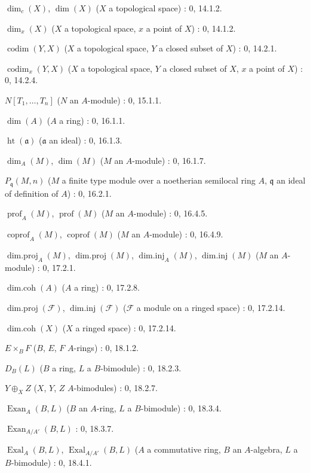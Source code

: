 $\dim_c(X)$, $\dim(X)$ ($X$ a topological space) : 0, 14.1.2.\par
$\dim_x(X)$ ($X$ a topological space, $x$ a point of $X$) : 0, 14.1.2.\par
$\operatorname{codim}(Y,X)$ ($X$ a topological space, $Y$ a closed subset of $X$) : 0, 14.2.1.\par
$\operatorname{codim}_x(Y,X)$ ($X$ a topological space, $Y$ a closed subset of $X$, $x$ a point of $X$) : 0, 14.2.4.\par
$N[T_1,\ldots,T_n]$ ($N$ an $A$-module) : 0, 15.1.1.\par
$\dim(A)$ ($A$ a ring) : 0, 16.1.1.\par
$\operatorname{ht}(\mathfrak a)$ ($\mathfrak a$ an ideal) : 0, 16.1.3.\par
$\dim_A(M)$, $\dim(M)$ ($M$ an $A$-module) : 0, 16.1.7.\par
$P_{\mathfrak q}(M,n)$ ($M$ a finite type module over a noetherian semilocal ring $A$, $\mathfrak q$ an ideal of definition of $A$) : 0, 16.2.1.\par
$\operatorname{prof}_A(M)$, $\operatorname{prof}(M)$ ($M$ an $A$-module) : 0, 16.4.5.\par
$\operatorname{coprof}_A(M)$, $\operatorname{coprof}(M)$ ($M$ an $A$-module) : 0, 16.4.9.\par
$\operatorname{dim.proj}_A(M)$, $\operatorname{dim.proj}(M)$,
$\operatorname{dim.inj}_A(M)$, $\operatorname{dim.inj}(M)$ ($M$ an $A$-module) : 0, 17.2.1.\par
$\operatorname{dim.coh}(A)$ ($A$ a ring) : 0, 17.2.8.\par
$\operatorname{dim.proj}(\mathscr F)$, $\operatorname{dim.inj}(\mathscr F)$
($\mathscr F$ a module on a ringed space) : 0, 17.2.14.\par
$\operatorname{dim.coh}(X)$ ($X$ a ringed space) : 0, 17.2.14.\par
$E\times_B F$ ($B$, $E$, $F$ $A$-rings) : 0, 18.1.2.\par
$D_B(L)$ ($B$ a ring, $L$ a $B$-bimodule) : 0, 18.2.3.\par
$Y\oplus_X Z$ ($X$, $Y$, $Z$ $A$-bimodules) : 0, 18.2.7.\par
$\operatorname{Exan}_A(B,L)$ ($B$ an $A$-ring, $L$ a $B$-bimodule) : 0, 18.3.4.\par
$\operatorname{Exan}_{A/A'}(B,L)$ : 0, 18.3.7.\par
$\operatorname{Exal}_A(B,L)$, $\operatorname{Exal}_{A/A'}(B,L)$ ($A$ a commutative ring, $B$ an $A$-algebra, $L$ a $B$-bimodule) : 0, 18.4.1.\par
